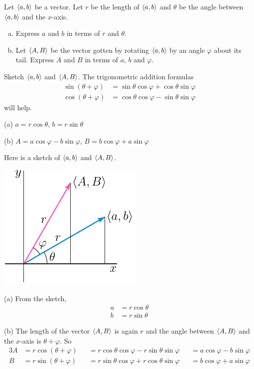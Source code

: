 \begin{question}
Let $\left< a, b\right>$ be a vector. Let $r$ be the length of $\left< a, b\right>$
and $\theta$ be the angle between $\left< a, b\right>$ and the $x$-axis.
\begin{enumerate}[(a)]
\item
Express $a$ and $b$ in terms of $r$ and $\theta$.
\item 
Let $\left< A, B\right>$ be the vector gotten by rotating $\left< a, b\right>$ 
by an angle $\varphi$ about its tail. Express $A$ and $B$ in terms of $a$, 
$b$ and $\varphi$.
\end{enumerate}
\end{question}

\begin{hint}
Sketch $\left< a, b\right>$ and $\left< A, B\right>$.
The trigonometric addition formulas 
\begin{align*}
\sin(\theta+\varphi)
       &=\sin\theta\cos\varphi+\cos\theta\sin\varphi \\
\cos(\theta+\varphi)
       &=\cos\theta\cos\varphi-\sin\theta\sin\varphi
\end{align*}
will help.
\end{hint}

\begin{answer}
(a) $a=r\cos\theta$, $b=r\sin\theta$

(b) $A=a\cos\varphi-b\sin\varphi$, 
    $B=b\cos\varphi+a\sin\varphi$
\end{answer}

\begin{solution}
Here is a sketch of $\left< a, b\right>$ and $\left< A, B\right>$.
\begin{center}
     \includegraphics{fig/polar4.pdf}
\end{center}
(a) From the sketch,
\begin{align*}
a&=r\cos\theta\\
b&=r\sin\theta
\end{align*}

(b) The length of the vector $\left< A, B\right>$ is again $r$
and the angle between $\left< A, B\right>$ and the $x$-axis is $\theta
+\varphi$. So
\begin{alignat*}{3}
A&=r\cos(\theta+\varphi)
&&=r\cos\theta\cos\varphi-r\sin\theta\sin\varphi
&&=a\cos\varphi-b\sin\varphi\\
B&=r\sin(\theta+\varphi)
&&=r\sin\theta\cos\varphi+r\cos\theta\sin\varphi
&&=b\cos\varphi+a\sin\varphi
\end{alignat*}

\end{solution}

